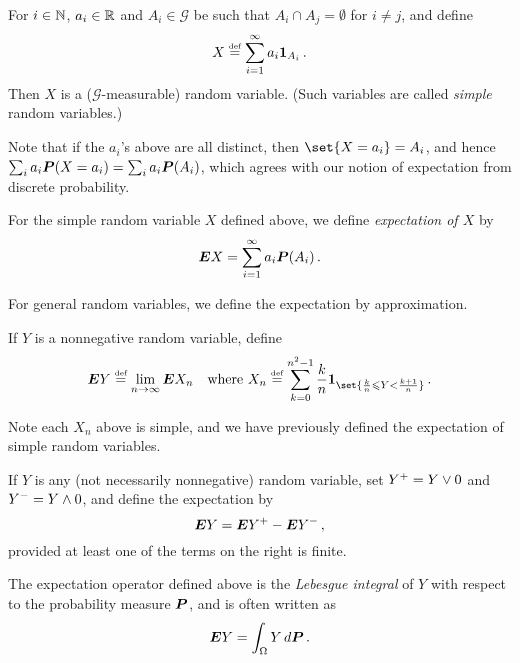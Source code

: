\begin{example}
  For $i \in \N$,  $a_i \in \R$ and $A_i \in \mathcal G$ be such that $A_i \cap A_j = \emptyset$ for $i \neq j$, and define
  \begin{equation*}
    X\defeq \sum_{i=1}^\infty a_i \one_{A_i}\,.
  \end{equation*}
  Then $X$ is a ($\mathcal G$-measurable) random variable.
  (Such variables are called \emph{simple} random variables.)
\end{example}

Note that if the $a_i$'s above are all distinct, then $\set{X = a_i} = A_i$, and hence $\sum_i a_i \P(X = a_i) = \sum_i a_i \P(A_i)$, which agrees with our notion of expectation from discrete probability.

\begin{definition}
  For the simple random variable $X$ defined above, we define \emph{expectation of $X$} by
  \begin{equation*}
    \E X = \sum_{i = 1}^\infty a_i \P(A_i)\,.
  \end{equation*}
\end{definition}

For general random variables, we define the expectation by approximation.
\begin{definition}
  If $Y$ is a nonnegative random variable, define
  \begin{equation*}
    \E Y \defeq \lim_{n \to \infty} \E X_n
    \quad\text{where }
    X_n \defeq \sum_{k=0}^{n^2-1} \frac{k}{n} \one_{\set{\frac{k}{n} \leq Y < \frac{k+1}{n}}}\,.
  \end{equation*}
\end{definition}
\begin{remark}
  Note each $X_n$ above is simple, and we have previously defined the expectation of simple random variables.
\end{remark}
\begin{definition}
  If $Y$ is any (not necessarily nonnegative) random variable, set $Y^+ = Y \varmax 0$ and $Y^- = Y \varmin 0$, and define the expectation by
  \begin{equation*}
    \E Y = \E Y^+ - \E Y^-\,,
  \end{equation*}
  provided at least one of the terms on the right is finite.
\end{definition}
\begin{remark}
  The expectation operator defined above is the \emph{Lebesgue integral} of $Y$ with respect to the probability measure $\P$, and is often written as
  \begin{equation*}
    \E Y = \int_\Omega Y \, d\P\,.
  \end{equation*}
\end{remark}

